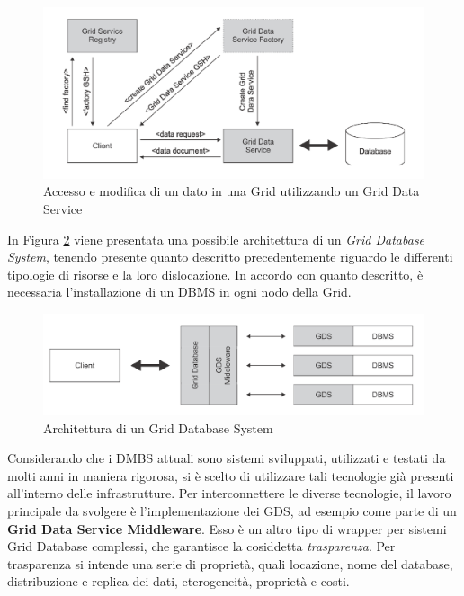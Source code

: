 \documentclass[11pt]{article}
\begin{document}
\begin{figure}[H]
\centering
\includegraphics[scale=0.40]{images/agds.png}
\caption{Accesso e modifica di un dato in una Grid utilizzando un Grid Data Service \cite{2}}
\label{accessogrid}
\end{figure}


In Figura \ref{archgridatabase} viene presentata una possibile architettura di un \emph{Grid Database System}, tenendo presente quanto descritto precedentemente riguardo le differenti tipologie di risorse e la loro dislocazione. In accordo con quanto descritto, è necessaria l'installazione di un DBMS in ogni nodo della Grid. 

\begin{figure}[H]
\centering
\includegraphics[scale=0.40]{images/archgrid.png}
\caption{Architettura di un Grid Database System \cite{2}}
\label{archgridatabase}
\end{figure}

Considerando che i DMBS attuali sono sistemi sviluppati, utilizzati e testati da molti anni in maniera rigorosa, si è scelto di utilizzare tali tecnologie già presenti all'interno delle infrastrutture. Per interconnettere le diverse tecnologie, il lavoro principale da svolgere è l'implementazione dei GDS, ad esempio come parte di un \textbf{Grid Data Service Middleware}. Esso è un altro tipo di wrapper per sistemi Grid Database complessi, che garantisce la cosiddetta \emph{trasparenza}. Per trasparenza si intende una serie di proprietà, quali locazione, nome del database, distribuzione e replica dei dati, eterogeneità, proprietà e costi. 
\end{document}
